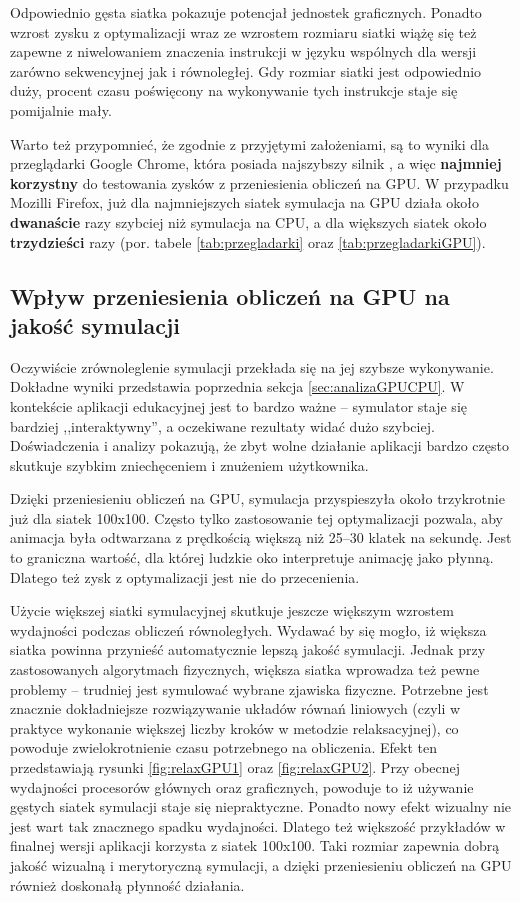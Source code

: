 Odpowiednio gęsta siatka pokazuje potencjał jednostek graficznych. Ponadto
wzrost zysku z optymalizacji wraz ze wzrostem rozmiaru siatki wiążę się też
zapewne z niwelowaniem znaczenia instrukcji w języku  wspólnych
dla wersji zarówno sekwencyjnej jak i równoległej. Gdy rozmiar siatki jest
odpowiednio duży, procent czasu poświęcony na wykonywanie tych instrukcje staje
się pomijalnie mały.

Warto też przypomnieć, że zgodnie z przyjętymi założeniami, są to wyniki dla
przeglądarki Google Chrome, która posiada najszybszy silnik \js, a więc
\textbf{najmniej korzystny} do testowania zysków z przeniesienia obliczeń na
GPU. W przypadku Mozilli Firefox, już dla najmniejszych siatek symulacja na GPU
działa około \textbf{dwanaście} razy szybciej niż symulacja na CPU, a dla
większych siatek około \textbf{trzydzieści} razy (por. tabele
\ref{tab:przegladarki} oraz \ref{tab:przegladarkiGPU}).

\subsection{Wpływ przeniesienia obliczeń na GPU na jakość symulacji}

Oczywiście zrównoleglenie symulacji przekłada się na jej szybsze wykonywanie.
Dokładne wyniki przedstawia poprzednia sekcja \ref{sec:analizaGPUCPU}. W
kontekście aplikacji edukacyjnej jest to bardzo ważne -- symulator staje się
bardziej ,,interaktywny'', a oczekiwane rezultaty widać dużo szybciej.
Doświadczenia i analizy pokazują, że zbyt wolne działanie aplikacji bardzo
często skutkuje szybkim zniechęceniem i znużeniem użytkownika.

Dzięki przeniesieniu obliczeń na GPU, symulacja przyspieszyła około trzykrotnie
już dla siatek 100x100. Często tylko zastosowanie tej optymalizacji pozwala, aby
animacja była odtwarzana z prędkością większą niż 25--30 klatek na sekundę. Jest
to graniczna wartość, dla której ludzkie oko interpretuje animację jako płynną.
Dlatego też zysk z optymalizacji jest nie do przecenienia.

Użycie większej siatki symulacyjnej skutkuje jeszcze większym wzrostem
wydajności podczas obliczeń równoległych. Wydawać by się mogło, iż większa
siatka powinna przynieść automatycznie lepszą jakość symulacji. Jednak przy
zastosowanych algorytmach fizycznych, większa siatka wprowadza też pewne
problemy -- trudniej jest symulować wybrane zjawiska fizyczne. Potrzebne jest
znacznie dokładniejsze rozwiązywanie układów równań liniowych (czyli w praktyce
wykonanie większej liczby kroków w metodzie relaksacyjnej), co powoduje
zwielokrotnienie czasu potrzebnego na obliczenia. Efekt ten przedstawiają
rysunki \ref{fig:relaxGPU1} oraz \ref{fig:relaxGPU2}. Przy obecnej wydajności
procesorów głównych oraz graficznych, powoduje to iż używanie gęstych siatek
symulacji staje się niepraktyczne. Ponadto nowy efekt wizualny nie jest wart
tak znacznego spadku wydajności. Dlatego też większość przykładów w finalnej
wersji aplikacji korzysta z siatek 100x100. Taki rozmiar zapewnia dobrą jakość
wizualną i merytoryczną symulacji, a dzięki przeniesieniu obliczeń na GPU
również doskonałą płynność działania.

